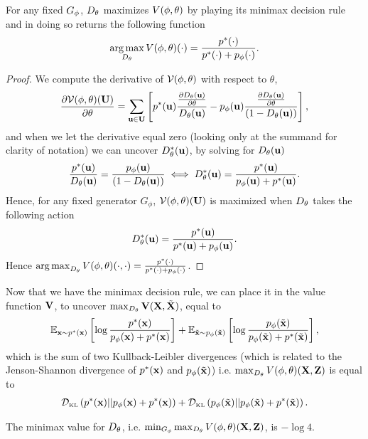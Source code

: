 \begin{theorem}%
 \label{theorem:minimax}
 For any fixed $G_\phi$, $D_\theta$ maximizes $V(\phi, \theta)$ by playing its minimax
 decision rule and in doing so returns the following function
  \begin{align}
    \operatorname*{arg\,max}_{D_\theta}V(\phi, \theta)(\cdot) = {p^*(\mathbf{\cdot}) \over p^*(\mathbf{\cdot}) + p_{\phi}(\mathbf{\cdot})}.
  \end{align}
\end{theorem}

\begin{proof}
  We compute the derivative of $\mathcal{V}(\phi, \theta)$ with respect to $\theta$,
  \begin{align}
    \label{eq:derivatives}
    {\partial \Va(\*U) \over \partial \theta} = \sum_{\*u \in \*U}\left[ \ptu { {\partial \D(\*u) \over \partial \theta} \over \D(\*u)} -
    \pgu {{\partial \D(\*u) \over \partial \theta} \over (1 - \D(\*u))}\right],
  \end{align}
  and when we let the derivative equal zero (looking only at the summand for
  clarity of notation) we can uncover $D_\theta^*(\mathbf{u})$, by solving for $D_\theta(\mathbf{u})$
  \begin{align}
    \label{eq:20}
    {\ptu \over \D(\*u)} = {\pgu \over (1 - \D(\*u))} \iff \D^*(\*u) = {\ptu \over \pgu + \ptu}.
  \end{align}
  Hence, for any fixed generator $G_\phi$, $\mathcal{V}(\phi, \theta)(\mathbf{U})$ is maximized when $D_\theta$ takes
  the following action
  \begin{align}
    \label{eq:13}
    \D^*(\*u) = \Dstar{u}.
  \end{align}
  Hence $\operatorname*{arg\,max}_{D_\theta}V(\phi, \theta)(\cdot, \cdot) = {p^*(\mathbf{\cdot}) \over p^*(\mathbf{\cdot}) + p_{\phi}(\mathbf{\cdot})}$.
\end{proof}

Now that we have the minimax decision rule, we can place it in the
value function $\mathbf{V}$, to uncover $\max_{D_\theta}\mathbf{V}(\mathbf{X}, \tilde{\mathbf{X}})$,
equal to
\begin{align}
  \label{eq:sum-of-two-kl-divergences}
   \mathbb{E}_{\*x \sim \pt}\left[\log{{\pt \over p_{\phi}(\*x)+ \pt}}\right] + \mathbb{E}_{\tilde{\*x} \sim \pg}\left[\log{\pg \over \pg + p^*(\tilde{\*x})} \right],
\end{align}
which is the sum of two Kullback-Leibler divergences (which is related
to the Jenson-Shannon divergence of $p^*(\mathbf{x})$ and $p_{\phi}(\tilde{\mathbf{x}})$)
i.e. $\max_{D_\theta}V(\phi, \theta)(\mathbf{X}, \mathbf{Z})$ is equal to
\begin{align}
  \label{eq:16}
  \KL{\pt}{p_{\phi}(\*x) + \pt} + \KL{\pg}{\pg + p^*(\tilde{\*x})}.
\end{align}
\begin{lemma}
  The minimax value for $D_\theta$, i.e. $\min_{G_\phi}\max_{D_\theta}V(\phi, \theta)(\mathbf{X}, \mathbf{Z})$, is $ -
  \log{4}$.
\end{lemma}

